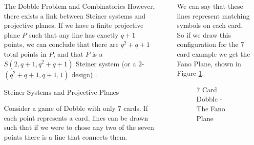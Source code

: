 \documentclass[final]{beamer}
\newlength{\sepwidth}
\newlength{\colwidth}
\newcommand{\separatorcolumn}{\begin{column}{\sepwidth}\end{column}}
\begin{document}
\begin{frame}[t]
\begin{columns}[t]
\begin{column}{\colwidth}
\begin{alertblock}{The Dobble Problem and Combinatorics}
However, there exists a link between Steiner systems and projective planes. If we have a finite projective plane $P$ such that any line has exactly $q+1$ points, we can conclude that there are $q^2+q+1$ total points in $P$, and that $P$ is a $S(2, q+ 1, q^2 +q+ 1)$
Steiner system (or a $2$-$(q^2 +q+ 1, q + 1, 1)$ design) \cite{storme2006}.
  \end{alertblock}

  \begin{block}{Steiner Systems and Projective Planes}

    Consider a game of Dobble with only $7$ cards. If each point represents a card, lines can be drawn such that if we were to chose any two of the seven points there is a line that connects them.
    
    \end{block}

\end{column}

\separatorcolumn

\begin{column}{\colwidth}

\begin{block}{}
    We can say that these lines represent matching symbols on each card. So if we draw this configuration for the $7$ card example we get the Fano Plane, shown in Figure \ref{fig:fano}.
    \begin{multicols}{2}
\begin{figure}
      \centering
      \caption{7 Card Dobble - The Fano Plane}
      \label{fig:fano}
\end{figure}


\end{multicols}
\end{block}
\end{column}
\end{columns}
\end{frame}
\end{document}
